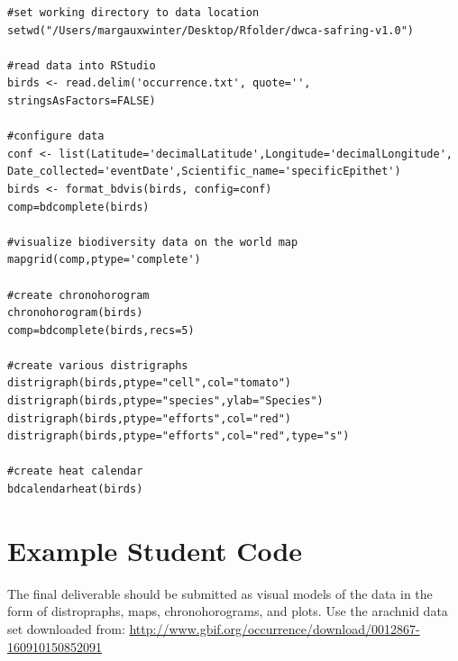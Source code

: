 \begin{lstlisting}[morekeywords={delim,Latitude,Longitude,config,Date_collected,Scientific_name,bdvis,bdcomplete,chronohorogram,distrigraph,bdcalendarheat,stringsAsFactors,ptype,recs,Scientific,name,Date,collected,mapgrid}]
#set working directory to data location
setwd("/Users/margauxwinter/Desktop/Rfolder/dwca-safring-v1.0")

#read data into RStudio
birds <- read.delim('occurrence.txt', quote='', stringsAsFactors=FALSE)

#configure data
conf <- list(Latitude='decimalLatitude',Longitude='decimalLongitude',
Date_collected='eventDate',Scientific_name='specificEpithet')
birds <- format_bdvis(birds, config=conf)
comp=bdcomplete(birds)

#visualize biodiversity data on the world map
mapgrid(comp,ptype='complete')

#create chronohorogram
chronohorogram(birds) 
comp=bdcomplete(birds,recs=5)

#create various distrigraphs
distrigraph(birds,ptype="cell",col="tomato") 
distrigraph(birds,ptype="species",ylab="Species") 
distrigraph(birds,ptype="efforts",col="red") 
distrigraph(birds,ptype="efforts",col="red",type="s") 

#create heat calendar
bdcalendarheat(birds) 
\end{lstlisting}

\section{Example Student Code}

The final deliverable should be submitted as visual models of the data in the form of distropraphs, maps, chronohorograms, and plots.
Use the arachnid data set downloaded from: \url{http://www.gbif.org/occurrence/download/0012867-160910150852091}


